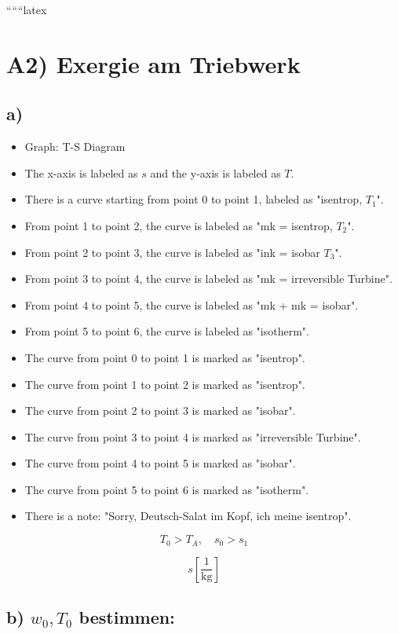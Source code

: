 
``````latex


\section*{A2) Exergie am Triebwerk}

\subsection*{a)}

\begin{itemize}
    \item Graph: T-S Diagram
    \item The x-axis is labeled as $s$ and the y-axis is labeled as $T$.
    \item There is a curve starting from point 0 to point 1, labeled as "isentrop, $T_1$".
    \item From point 1 to point 2, the curve is labeled as "mk = isentrop, $T_2$".
    \item From point 2 to point 3, the curve is labeled as "ink = isobar $T_3$".
    \item From point 3 to point 4, the curve is labeled as "mk = irreversible Turbine".
    \item From point 4 to point 5, the curve is labeled as "mk + mk = isobar".
    \item From point 5 to point 6, the curve is labeled as "isotherm".
    \item The curve from point 0 to point 1 is marked as "isentrop".
    \item The curve from point 1 to point 2 is marked as "isentrop".
    \item The curve from point 2 to point 3 is marked as "isobar".
    \item The curve from point 3 to point 4 is marked as "irreversible Turbine".
    \item The curve from point 4 to point 5 is marked as "isobar".
    \item The curve from point 5 to point 6 is marked as "isotherm".
    \item There is a note: "Sorry, Deutsch-Salat im Kopf, ich meine isentrop".
\end{itemize}

\[
T_0 > T_A, \quad s_0 > s_1
\]

\[
s \left[ \frac{1}{\text{kg}} \right]
\]

\subsection*{b) $w_0, T_0$ bestimmen:}

